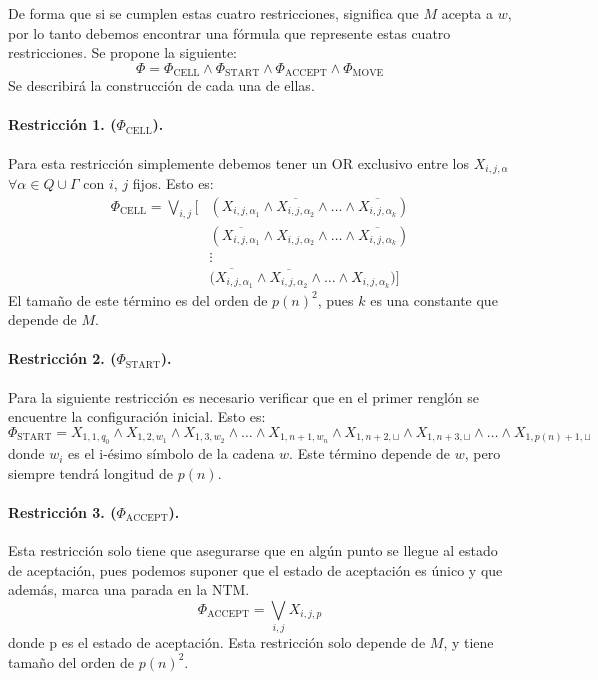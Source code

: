 \documentclass[a4paper]{article}
\begin{document}
De forma que si se cumplen estas cuatro restricciones, significa que $M$ acepta a $w$, por lo tanto debemos encontrar una fórmula que represente estas cuatro restricciones.
Se propone la siguiente:
$$\Phi = \Phi_{\text{CELL}} \land \Phi_{\text{START}} \land \Phi_{\text{ACCEPT}} \land \Phi_{\text{MOVE}}$$
Se describirá la construcción de cada una de ellas.

\paragraph{Restricción 1. ($\Phi_{\text{CELL}}$).}

Para esta restricción simplemente debemos tener un OR exclusivo entre los $X_{i,j,\alpha}$ $\forall \alpha \in Q \cup \Gamma$ con $i$, $j$ fijos. Esto es:
\begin{align*}
  \Phi_{\text{CELL}} = \bigvee_{i,j} \Big[ &(X_{i,j,\alpha_1} \land \overline{X_{i,j,\alpha_2}} \land \dots \land \overline{X_{i,j,\alpha_k}}) \\
  &(\overline{X_{i,j,\alpha_1}} \land X_{i,j,\alpha_2} \land \dots \land \overline{X_{i,j,\alpha_k}})\\
  &\vdots\\
  &\overline{(X_{i,j,\alpha_1}} \land \overline{X_{i,j,\alpha_2}} \land \dots \land X_{i,j,\alpha_k}) \Big]
\end{align*}
El tamaño de este término es del orden de $p(n)^2$, pues $k$ es una constante que depende de $M$.

\paragraph{Restricción 2. ($\Phi_{\text{START}}$).}

Para la siguiente restricción es necesario verificar que en el primer renglón se encuentre la configuración inicial. Esto es:
$$\Phi_{\text{START}} = X_{1,1,q_0} \land X_{1,2,w_1} \land X_{1,3,w_2} \land \dots \land X_{1,n+1,w_n} \land X_{1,n+2,\sqcup} \land X_{1,n+3,\sqcup} \land \dots \land X_{1,p(n)+1,\sqcup}$$
donde $w_i$ es el i-ésimo símbolo de la cadena $w$. Este término depende de $w$, pero siempre tendrá longitud de $p(n)$.

\paragraph{Restricción 3. ($\Phi_{\text{ACCEPT}}$).}

Esta restricción solo tiene que asegurarse que en algún punto se llegue al estado de aceptación, pues podemos suponer que el estado de aceptación es único y que además, marca una parada en la NTM.
$$\Phi_{\text{ACCEPT}} = \bigvee_{i, j} X_{i,j,p}$$
donde p es el estado de aceptación. Esta restricción solo depende de $M$, y tiene tamaño del orden de $p(n)^2$.
\end{document}
